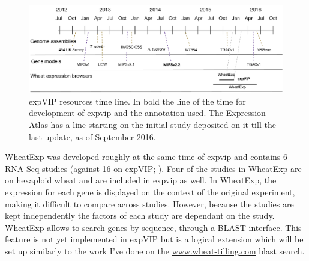 \begin{figure}[b!]
\includegraphics[width=1\textwidth]{expVIP/Figures/Timeline.pdf}
\caption[expVIP resources time line]{expVIP resources time line. In bold the line of the time for development of \gls{expvip} and the annotation used. The Expression Atlas has a line starting on the initial study deposited on it till the last update, as of September 2016.}
\label{fig:exp:timeline}
\end{figure}



WheatExp was developed roughly at the same time of \gls{expvip} and contains 6 RNA-Seq studies (against 16 on expVIP; \citealt{Pearce2015b}). 
Four of the studies in WheatExp are on hexaploid wheat and are included in \gls{expvip} as well. 
In WheatExp, the expression for each gene is displayed on the context of the original experiment, making it difficult to compare across studies. 
However, because the studies are kept independently the factors of each study are dependant on the study. 
WheatExp allows to search genes by sequence, through a BLAST interface. 
This feature is not yet implemented in expVIP but is a logical extension which will be set up similarly to the work I've done on the \url{www.wheat-tilling.com} blast search.  

